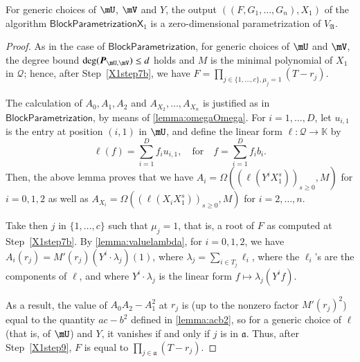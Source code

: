 \documentclass[final,1p,times,authoryear]{elsarticle}
\newcommand{\mat}[1]{\bm{\MakeUppercase{#1}}} %
\newcommand{\mainalgoname}{\mathsf{ BlockParametrization}}
\newcommand{\mf}{Y}
\newcommand{\residueI}{\mathscr{Q}}
\def\K{\mathbb{K}}
\def\K {\ensuremath{\mathbb{K}}}
\begin{document}
\begin{lemma}
  For generic choices of $\mU$, $\mV$ and $\mf$, the output
  $((F,G_1,\dots,G_n),X_1)$ of the algorithm $\mathsf{BlockParametrizationX}_1$
  is a zero-dimensional parametrization of $V_{\mathfrak{A}}$.
\end{lemma}
\begin{proof}
  As in the case of $\mainalgoname$, for generic choices of $\mU$ and
  $\mV$, the degree bound $\deg(\mat{P}_{\mU,\mV}) \le d$ holds and
  $M$ is the minimal polynomial of $X_1$ in $\residueI$; hence, after
  Step~\ref{X1step7b}, we have $F=\prod_{j \in \{1,\dots,c\}, \mu_j=1}
  (T-r_j)$. 

  The calculation of $A_0,A_1,A_2$ and $A_{X_2},\dots,A_{X_n}$ is
  justified as in $\mainalgoname$, by means of
  \cref{lemma:omegaOmega}. For $i=1,\dots,D$, let $u_{i,1}$ is the entry at position
  $(i,1)$ in $\mU$, and define the linear 
  form $\ell: \residueI \to \K$ by 
  \[
    \ell(f) = \sum_{i=1}^D f_i u_{i,1}, \quad\text{for}\quad f =
    \sum_{i=1}^D f_i b_i.
  \]
  Then, the above lemma proves that we have $A_i = \Omega((\ell(\mf^i
  X_1^s))_{s\ge0},M)$ for $i=0,1,2$ as well as $A_{X_i} = \Omega((\ell(X_i
  X_1^s))_{s\ge0},M)$ for $i=2,\dots,n$.

  Take then $j$ in $\{1,\dots,c\}$ such that $\mu_j=1$, that is, a
  root of $F$ as computed at Step~\ref{X1step7b}. By
  \cref{lemma:valuelambda}, for $i=0,1,2$, we have $ A_i(r_j) = M'(r_j)
  (\mf^i \cdot \lambda_j)(1)$, where $\lambda_j =\sum_{i \in T_j}
  \ell_i$, where the $\ell_i$'s are the components of $\ell$,
  and where $\mf^i \cdot \lambda_j$ is the linear form $f \mapsto \lambda_j(\mf^i f)$.

  As a result, the value of $ A_0  A_2 -  A_1^2$ at
  $r_j$ is (up to the nonzero factor $M'(r_j)^2$) equal to the
  quantity $ac-b^2$ defined in \cref{lemma:acb2}, so for a
  generic choice of $\ell$ (that is, of $\mU$) and $\mf$, it vanishes if and only if $j$ is
  in $\mathfrak{a}$. Thus, after Step~\ref{X1step9}, 
  $F$ is equal to $\prod_{j \in \mathfrak{a}} (T-r_j)$.


\end{proof}
\end{document}
